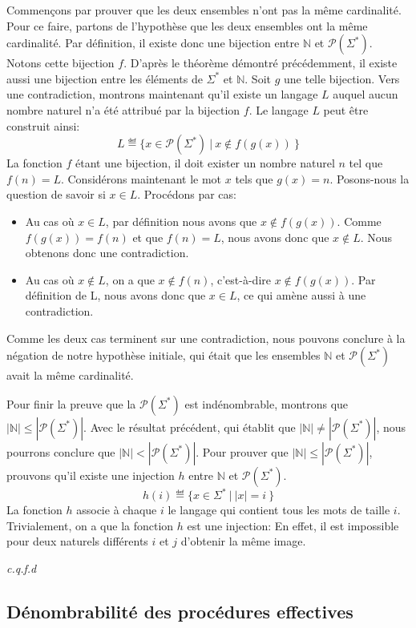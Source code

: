 Commençons par prouver que les deux ensembles n'ont pas la même cardinalité.
Pour ce faire, partons de l'hypothèse que les deux ensembles ont la même cardinalité.
Par définition, il existe donc une bijection entre $\mathbb{N}$ et $\mathcal{P}(\Sigma^*)$.
Notons cette bijection $f$.
D'après le théorème démontré précédemment, il existe aussi une bijection entre les éléments de $\Sigma^*$ et $\mathbb{N}$.
Soit $g$ une telle bijection. 
Vers une contradiction, montrons maintenant qu'il existe un langage $L$ auquel aucun nombre naturel n'a été attribué par la bijection $f$.
Le langage $L$ peut être construit ainsi: 
\[
L \eqdef \{ x \in \mathcal{P}(\Sigma^*)\ |\ x \not\in f(g(x))\ \}
\]
La fonction $f$ étant une bijection, il doit exister un nombre naturel $n$ tel que $f(n) = L$.
Considérons maintenant le mot $x$ tels que $g(x) = n$.
Posons-nous la question de savoir si $x \in L$.
Procédons par cas:
\begin{itemize}
\item
Au cas où $x \in L$, par définition nous avons que $x \not\in f(g(x))$.
Comme $f(g(x)) = f(n)$ et que $f(n) = L$, nous avons donc que $x \not\in L$.
Nous obtenons donc une contradiction.
\item
Au cas où $x \not\in L$, on a que $x \not\in f(n)$, c'est-à-dire $x \not\in f(g(x))$.
Par définition de L, nous avons donc que $x \in L$, ce qui amène aussi à une contradiction.
\end{itemize}
Comme les deux cas terminent sur une contradiction, nous pouvons conclure à la négation de notre hypothèse initiale, qui était que les ensembles $\mathbb{N}$ et $\mathcal{P}(\Sigma^*)$ avait la même cardinalité.

Pour finir la preuve que la $\mathcal{P}(\Sigma^*)$ est indénombrable, montrons que $|\mathbb{N}| \leq |\mathcal{P}(\Sigma^*)|$. Avec le résultat précédent, qui établit que $|\mathbb{N}| \neq |\mathcal{P}(\Sigma^*)|$, nous pourrons conclure que $|\mathbb{N}| < |\mathcal{P}(\Sigma^*)|$.
Pour prouver que $|\mathbb{N}| \leq |\mathcal{P}(\Sigma^*)|$, prouvons qu'il existe une injection $h$ entre $\mathbb{N}$ et $\mathcal{P}(\Sigma^*)$.
\[
h(i) \eqdef \{ x \in \Sigma^*\ |\ |x| = i\ \}
\]
La fonction $h$ associe à chaque $i$ le langage qui contient tous les mots de taille $i$. Trivialement, on a que la fonction $h$ est une injection: En effet, il est impossible pour deux naturels différents $i$ et $j$ d'obtenir la même image.

\textit{c.q.f.d}

\subsection{Dénombrabilité des procédures effectives}

